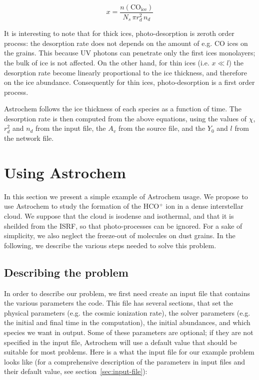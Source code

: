 \documentclass[a4paper,12pt]{article}
\newcommand{\conc}[1]{n(\mathrm{#1})}
\begin{document}
\begin{equation}
  x = \frac{\conc{CO_{ice}}}{N_{s} \, \pi r_{d}^2 \, n_{d}}
  \label{eq:ice-thickness}
\end{equation}

\noindent
It is interesting to note that for thick ices, photo-desorption is
zeroth order process: the desorption rate does not depends on the
amount of e.g. CO ices on the grains. This because UV photons can
penetrate only the first ices monolayers; the bulk of ice is not
affected. On the other hand, for thin ices (i.e. $x \ll l$) the
desorption rate become linearly proportional to the ice thickness, and
therefore on the ice abundance. Consequently for thin ices,
photo-desorption is a first order process.

Astrochem follows the ice thickness of each species as a function of
time. The desorption rate is then computed from the above equations,
using the values of $\chi$, $r_{d}^2$ and $n_{d}$ from the input file,
the $A_{v}$ from the source file, and the $Y_{0}$ and $l$ from the
network file.

\section{Using Astrochem}
\label{sec:using-astrochem}

In this section we present a simple example of Astrochem usage.  We
propose to use Astrochem to study the formation of the HCO$^{+}$ ion
in a dense interstellar cloud. We suppose that the cloud is isodense
and isothermal, and that it is sheilded from the ISRF, so that
photo-processes can be ignored. For a sake of simplicity, we also
neglect the freeze-out of  molecules on dust grains. In the following,
we describe the various steps needed to solve this problem.

\subsection{Describing the problem}
\label{sec:describing-problem}

In order to describe our problem, we first need create an input file
that contains the various parameters the code. This file has several
sections, that set the physical parameters (e.g. the cosmic ionization
rate), the solver parameters (e.g. the initial and final time in the
computation), the initial abundances, and which species we want in
output. Some of these parameters are optional; if they are not
specified in the input file, Astrochem will use a default value that
should be suitable for most problems. Here is a what the input file
for our example problem looks like (for a comprehensive description of
the parameters in input files and their default value, see
section~\ref{sec:input-file}):
\end{document}
